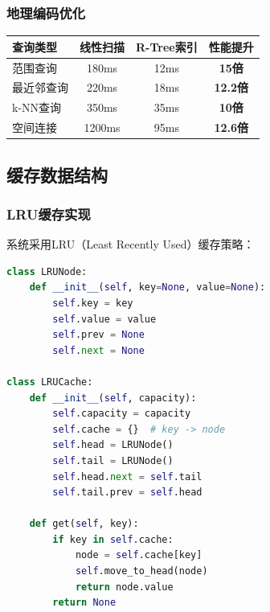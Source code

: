 \documentclass[12pt,a4paper]{article}
\begin{document}
\subsubsection{地理编码优化}
\begin{table}[H]
\centering
\begin{tcolorbox}[
    colback=light,
    colframe=success,
    title={\textbf{空间查询性能对比}},
    coltitle=white,
    colbacktitle=success,
    fonttitle=\bfseries,
    rounded corners=5pt,
    width=0.85\textwidth
]
\begin{tabular}{lccc}
\toprule
\rowcolor{success!20}
\textbf{查询类型} & \textbf{线性扫描} & \textbf{R-Tree索引} & \textbf{性能提升} \\
\midrule
范围查询 & 180ms & 12ms & \textcolor{success}{\textbf{15倍}} \\
\rowcolor{light}
最近邻查询 & 220ms & 18ms & \textcolor{success}{\textbf{12.2倍}} \\
k-NN查询 & 350ms & 35ms & \textcolor{success}{\textbf{10倍}} \\
\rowcolor{light}
空间连接 & 1200ms & 95ms & \textcolor{success}{\textbf{12.6倍}} \\
\bottomrule
\end{tabular}
\end{tcolorbox}
\end{table}

\subsection{缓存数据结构}

\subsubsection{LRU缓存实现}
系统采用LRU（Least Recently Used）缓存策略：

\begin{lstlisting}[language=python, caption={LRU缓存数据结构}]
class LRUNode:
    def __init__(self, key=None, value=None):
        self.key = key
        self.value = value
        self.prev = None
        self.next = None

class LRUCache:
    def __init__(self, capacity):
        self.capacity = capacity
        self.cache = {}  # key -> node
        self.head = LRUNode()
        self.tail = LRUNode()
        self.head.next = self.tail
        self.tail.prev = self.head
        
    def get(self, key):
        if key in self.cache:
            node = self.cache[key]
            self.move_to_head(node)
            return node.value
        return None
\end{lstlisting}
\end{document}
